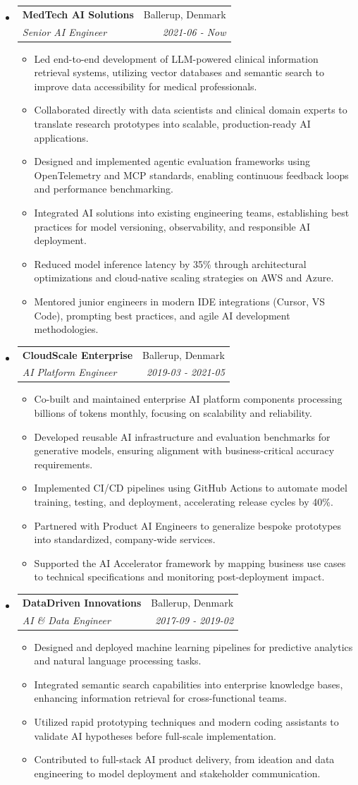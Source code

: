 \documentclass[letterpaper,11pt]{article}
\makeatletter
\newcommand{\resitem}[1]{\item #1 \vspace{-2pt}}
\newcommand{\ressubheading}[4]{
    \begin{tabular*}{6.5in}{p{4.8in}@{\extracolsep{\fill}}r}
            \textbf{#1} & #2 \\
            \textit{#3} & \textit{#4} \\
    \end{tabular*}\vspace{-8pt}}
\makeatother
\begin{document}
      \begin{itemize}
        \item \ressubheading{MedTech AI Solutions}{Ballerup, Denmark}{Senior AI Engineer}{2021-06 - Now}
        \begin{itemize}
            \resitem{Led end-to-end development of LLM-powered clinical information retrieval systems, utilizing vector databases and semantic search to improve data accessibility for medical professionals.}
            \resitem{Collaborated directly with data scientists and clinical domain experts to translate research prototypes into scalable, production-ready AI applications.}
            \resitem{Designed and implemented agentic evaluation frameworks using OpenTelemetry and MCP standards, enabling continuous feedback loops and performance benchmarking.}
            \resitem{Integrated AI solutions into existing engineering teams, establishing best practices for model versioning, observability, and responsible AI deployment.}
            \resitem{Reduced model inference latency by 35\% through architectural optimizations and cloud-native scaling strategies on AWS and Azure.}
            \resitem{Mentored junior engineers in modern IDE integrations (Cursor, VS Code), prompting best practices, and agile AI development methodologies.}
        \end{itemize}
        \item \ressubheading{CloudScale Enterprise}{Ballerup, Denmark}{AI Platform Engineer}{2019-03 - 2021-05}
        \begin{itemize}
            \resitem{Co-built and maintained enterprise AI platform components processing billions of tokens monthly, focusing on scalability and reliability.}
            \resitem{Developed reusable AI infrastructure and evaluation benchmarks for generative models, ensuring alignment with business-critical accuracy requirements.}
            \resitem{Implemented CI/CD pipelines using GitHub Actions to automate model training, testing, and deployment, accelerating release cycles by 40\%.}
            \resitem{Partnered with Product AI Engineers to generalize bespoke prototypes into standardized, company-wide services.}
            \resitem{Supported the AI Accelerator framework by mapping business use cases to technical specifications and monitoring post-deployment impact.}
        \end{itemize}
        \item \ressubheading{DataDriven Innovations}{Ballerup, Denmark}{AI \& Data Engineer}{2017-09 - 2019-02}
        \begin{itemize}
            \resitem{Designed and deployed machine learning pipelines for predictive analytics and natural language processing tasks.}
            \resitem{Integrated semantic search capabilities into enterprise knowledge bases, enhancing information retrieval for cross-functional teams.}
            \resitem{Utilized rapid prototyping techniques and modern coding assistants to validate AI hypotheses before full-scale implementation.}
            \resitem{Contributed to full-stack AI product delivery, from ideation and data engineering to model deployment and stakeholder communication.}
        \end{itemize}
      \end{itemize}
\end{document}
